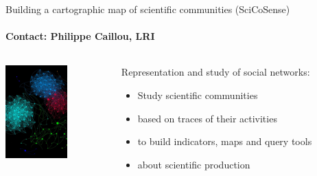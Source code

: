 \begin{frame}{Building a cartographic map of scientific communities (SciCoSense) }
  \framesubtitle{Contact: Philippe Caillou, LRI}

  \begin{columns}
    \begin{column}{4cm}
      \includegraphics[width=\linewidth]{Images/scicosence-image.png}
    \end{column}
    \begin{column}{10cm}
      Representation and study of social networks:
      \begin{itemize}
      \item Study scientific communities
      \item based on traces of their activities
      \item to build indicators, maps and query tools
      \item about scientific production
      \end{itemize}
      \end{column}
  \end{columns}

\end{frame}


